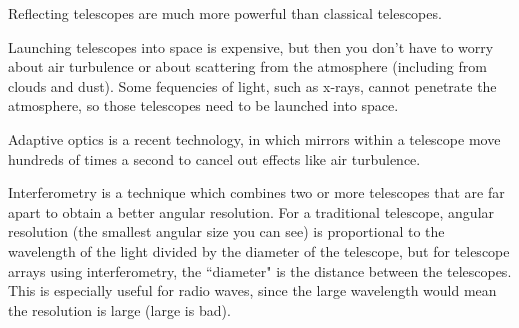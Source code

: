 \documentclass[class=article, crop=false]{standalone}
\begin{document}
\par
Reflecting telescopes are much more powerful than classical telescopes.
\par
Launching telescopes into space is expensive, but then you don't have to worry about air turbulence or about scattering from the atmosphere (including from clouds and dust). Some fequencies of light, such as x-rays, cannot penetrate the atmosphere, so those telescopes need to be launched into space.
\par
Adaptive optics is a recent technology, in which mirrors within a telescope move hundreds of times a second to cancel out effects like air turbulence.
\par
Interferometry is a technique which combines two or more telescopes that are far apart to obtain a better angular resolution. For a traditional telescope, angular resolution (the smallest angular size you can see) is proportional to the wavelength of the light divided by the diameter of the telescope, but for telescope arrays using interferometry, the ``diameter" is the distance between the telescopes. This is especially useful for radio waves, since the large wavelength would mean the resolution is large (large is bad).
\end{document}
